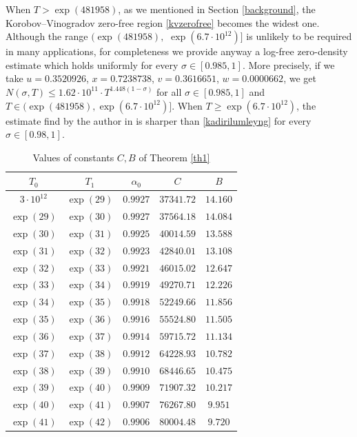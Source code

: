 \documentclass[reqno]{amsart}
\numberwithin{equation}{section}
\theoremstyle{remark}
\begin{document}
When $T>\exp(481958)$, as we mentioned in Section \ref{background}, the Korobov--Vinogradov zero-free region \eqref{kvzerofree} becomes the widest one. Although the range $(\exp(481958),$ $\exp(6.7\cdot 10^{12})]$ is unlikely to be required in many applications, for completeness we provide anyway a log-free zero-density estimate which holds uniformly for every $\sigma\in [0.985,1]$. More precisely, if we take $u=0.3520926$, $x=0.7238738$, $v=0.3616651$, $w=0.0000662$, we get $N(\sigma,T)\le 1.62\cdot 10^{11}\cdot T^{1.448(1-\sigma)}$ for all $\sigma\in [0.985,1]$ and $T\in (\exp(481958),\exp(6.7\cdot 10^{12})]$. When $T\ge \exp(6.7\cdot 10^{12})$, the estimate find by the author in \cite{bellotti2023explicit} is sharper than \eqref{kadirilumleyng} for every $\sigma\in [0.98,1]$. 
\begin{table}[h]
\def\arraystretch{1.3}
\centering
\caption{Values of constants $C,B$ of Theorem \ref{th1}}
\begin{tabular}{|c|c|c|c|c|}
\hline
$T_0$ & $T_1$ & $\alpha_0$ & $C$ & $B$\\
\hline
$3\cdot 10^{12} $ & $\exp(29)$ & $0.9927$ & $37341.72$ & $14.160$ \\
\hline
$\exp(29)$ & $\exp(30)$ & $0.9927$ & $ 37564.18$ & $14.084$ \\
\hline
$\exp(30)$ & $\exp(31)$ & $0.9925$ & $40014.59$ & $13.588$ \\
\hline
$\exp(31)$ & $\exp(32)$ & $0.9923$ & $42840.01$ & $13.108$ \\
\hline
$\exp(32)$ & $\exp(33)$ & $0.9921$ & $46015.02$ & $12.647$ \\
\hline
$\exp(33)$ & $\exp(34)$ & $0.9919$ & $49270.71$ & $12.226$ \\
\hline
$\exp(34)$ & $\exp(35)$ & $0.9918$ & $52249.66$ & $11.856$ \\
\hline
$\exp(35)$ & $\exp(36)$ & $0.9916$ & $55524.80$ & $11.505$ \\
\hline
$\exp(36)$ & $\exp(37)$ & $0.9914$ & $59715.72$ & $11.134$ \\
\hline
$\exp(37)$ & $\exp(38)$ & $0.9912$ & $64228.93$ & $10.782$ \\
\hline
$\exp(38)$ & $\exp(39)$ & $0.9910$ & $68446.65$ & $10.475$\\
\hline
$\exp(39)$ & $\exp(40)$ & $0.9909$ & $71907.32$ & $10.217$\\
\hline
$\exp(40)$ & $\exp(41)$ & $0.9907$ & $76267.80$ & $9.951$\\
\hline
$\exp(41)$ & $\exp(42)$ & $0.9906$ & $80004.48$ & $9.720$\\

\end{tabular}
\end{table}
\end{document}
